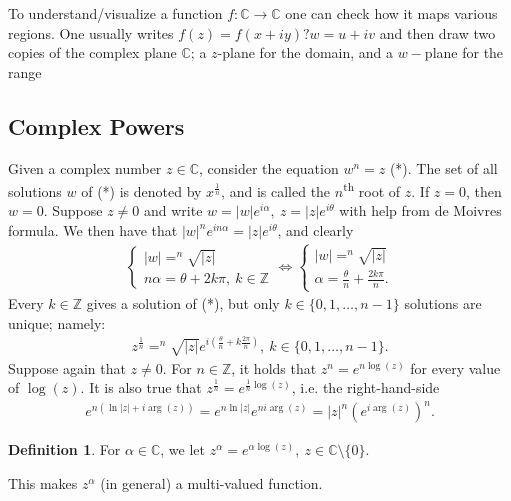 \documentclass[12pt, a4paper]{article}
\theoremstyle{plain}
\theoremstyle{definition}
\newtheorem{definition}{Definition} %
\begin{document}
			To understand/visualize a function $f:\mathbb{C}\to\mathbb{C}$ one can check how it maps various regions. One usually writes $f(z)=f(x+iy) ? w = u+iv$ and then draw two copies of the complex plane $\mathbb{C}$; a $z$-plane for the domain, and a $w-$plane for the range
		\subsection{Complex Powers} %
		\label{sub:complex_powers}
			Given a complex number $z\in \mathbb{C}$, consider the equation $w^n=z$ (*). The set of all solutions $w$ of (*) is denoted by $x^{\frac{1}{n}}$, and is called the $n$\textsuperscript{th} root of $z$. If $z=0$, then $w=0$. Suppose $z\not=0$ and write $w=|w|e^{i \alpha},\:z=|z|e^{i\theta}$ with help from de Moivres formula. We then have that $|w|^ne^{in \alpha} = |z|e^{i\theta}$, and clearly
			\begin{align*}
				\begin{cases}
					|w| = ^n\sqrt{|z|}\\
					n\alpha = \theta + 2k\pi,\:k\in \mathbb{Z}
				\end{cases}\iff
				\begin{cases}
					|w| = ^n\sqrt{|z|}\\
					\alpha = \frac{\theta}{n} + \frac{2k\pi}{n}.
				\end{cases}
			\end{align*}
			Every $k\in \mathbb{Z}$ gives a solution of (*), but only $k\in\{0,1,\ldots,n-1\}$ solutions are unique; namely:
			\begin{align*}
				z^{\frac{1}{n}} = ^n\sqrt{|z|}e^{i(\frac{\theta}{n}+k \frac{2\pi}{n})},\: k\in\{0,1,\ldots,n-1\}.
			\end{align*}
			Suppose again that $z\not=0$. For $n\in \mathbb{Z}$, it holds that $z^n=e^{n\log(z)}$ for every value of $\log(z)$. It is also true that $z^{\frac{1}{n}} = e^{\frac{1}{n}\log(z)}$, i.e. the right-hand-side
			\begin{align*}
				e^{n(\ln|z|+i\arg(z))} = e^{n\ln|z|}e^{ni\arg(z)} = |z|^n(e^{i\arg(z)})^n.
			\end{align*}
			\begin{definition}
				For $\alpha\in \mathbb{C}$, we let $z^\alpha = e^{\alpha\log(z)},\:z\in \mathbb{C}\setminus\{0\}$.
			\end{definition}

			This makes $z^\alpha$ (in general) a multi-valued function.\\
\end{document}
